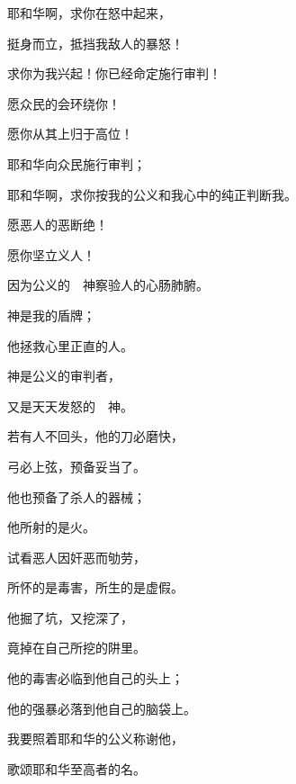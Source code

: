 {\BB \par }{\Q {}耶和华啊，求你在怒中起来，
\par }{\Q 挺身而立，抵挡我敌人的暴怒！
\par }{\Q 求你为我兴起！你已经命定施行审判！
\par }{\Q {}愿众民的会环绕你！
\par }{\Q 愿你从其上归于高位！
\par }{\Q {}耶和华向众民施行审判；
\par }{\Q 耶和华啊，求你按我的公义和我心中的纯正判断我。
\par }{\BB \par }{\Q {}愿恶人的恶断绝！
\par }{\Q 愿你坚立义人！
\par }{\Q 因为公义的　神察验人的心肠肺腑。
\par }{\Q {}神是我的盾牌；
\par }{\Q 他拯救心里正直的人。
\par }{\Q {}神是公义的审判者，
\par }{\Q 又是天天{}发怒的　神。
\par }{\BB \par }{\Q {}若有人不回头，他的刀必磨快，
\par }{\Q 弓必上弦，预备妥当了。
\par }{\Q {}他也预备了杀人的器械；
\par }{\Q 他所射的是火{}。
\par }{\Q {}试看恶人因奸恶而劬劳，
\par }{\Q 所怀的是毒害，所生的是虚假。
\par }{\Q {}他掘了坑，又挖深了，
\par }{\Q 竟掉在自己所挖的阱里。
\par }{\Q {}他的毒害必临到他自己的头上；
\par }{\Q 他的强暴必落到他自己的脑袋上。
\par }{\BB \par }{\Q {}我要照着耶和华的公义称谢他，
\par }{\Q 歌颂耶和华至高者的名。

}
